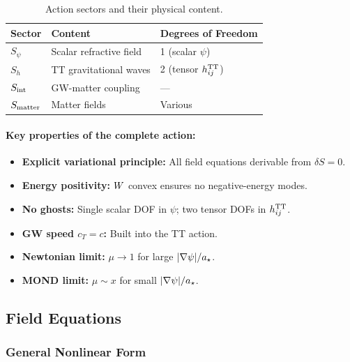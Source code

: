 \begin{table}[t]
\caption{Action sectors and their physical content.}
\label{tab:action_sectors}
\begin{ruledtabular}
\begin{tabular}{lll}
Sector & Content & Degrees of Freedom \\
\hline
$S_\psi$ & Scalar refractive field & 1 (scalar $\psi$) \\
$S_h$ & TT gravitational waves & 2 (tensor $h_{ij}^{\rm TT}$) \\
$S_{\rm int}$ & GW-matter coupling & --- \\
$S_{\rm matter}$ & Matter fields & Various \\
\end{tabular}
\end{ruledtabular}
\end{table}

\paragraph{Key properties of the complete action:}
\begin{itemize}
\item \textbf{Explicit variational principle:} All field equations derivable 
from $\delta S = 0$.
\item \textbf{Energy positivity:} $W$ convex ensures no negative-energy modes.
\item \textbf{No ghosts:} Single scalar DOF in $\psi$; two tensor DOFs in $h_{ij}^{\rm TT}$.
\item \textbf{GW speed $c_T = c$:} Built into the TT action.
\item \textbf{Newtonian limit:} $\mu \to 1$ for large $|\nabla\psi|/a_\star$.
\item \textbf{MOND limit:} $\mu \sim x$ for small $|\nabla\psi|/a_\star$.
\end{itemize}

\subsection{Field Equations}\label{sec:field_equations}

\subsubsection{General Nonlinear Form}

